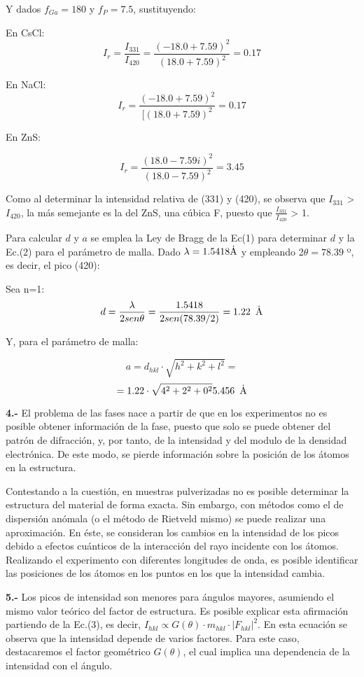 \documentclass[a4paper,twocolumn,10pt]{article}
\begin{document}
Y dados $f_{Ga} = 180$ y $f_{P} =7.5$, sustituyendo:

En CsCl:
$$
I_r = \frac{I_{331}}{I_{420}} = \frac{(-18.0 + 7.59)^2}{(18.0 + 7.59)^2} = 0.17
$$

En NaCl:
$$
I_r =  \frac{ (-18.0 + 7.59)^2}{[(18.0 + 7.59)^2} = 0.17
$$

En ZnS:

$$
I_r = \frac{ (18.0 - 7.59i)^2}{(18.0 - 7.59)^2} = 3.45
$$

Como al determinar la intensidad relativa de (331) y (420), se observa que $I_{331}$ > $I_{420}$, la más semejante es la del ZnS, una cúbica F, puesto que $\frac{I_{331}}{I_{420}}$ > 1.

Para calcular $d$ y $a$ se emplea la Ley de Bragg de la Ec(1) para determinar $d$ y la Ec.(2) para el parámetro de malla. Dado $\lambda = 1.5418 \rm \dot{A}$ y empleando 2$\theta = 78.39$ º, es decir, el pico (420):

Sea n=1:
$$
d= \frac{\lambda}{2sen\theta} = \frac{1.5418}{2sen(78.39/2)} = 1.22 \rm \textcolor{white}{a} \dot{A}
$$

Y, para el parámetro de malla:

$$
a =  d_{hkl} \cdot \sqrt{h^2 + k^2 + l^2} = 
$$
$$
= 1.22 \cdot \sqrt{4^2 + 2^2 + 0^2} 5.456 \rm \textcolor{white}{a} \dot{A}
$$

\textbf{4.- } El problema de las fases nace a partir de que en los experimentos no es posible obtener información de la fase, puesto que solo se puede obtener del patrón de difracción, y, por tanto, de la intensidad y del modulo de la densidad electrónica. De este modo, se pierde información sobre la posición de los átomos en la estructura.

Contestando a la cuestión, en muestras pulverizadas no es posible determinar la estructura del material de forma exacta. Sin embargo, con métodos como el de dispersión anómala (o el método de Rietveld mismo) se puede realizar una aproximación. En éste, se consideran los cambios en la intensidad de los picos debido a efectos cuánticos de la interacción del rayo incidente con los átomos. Realizando el experimento con diferentes longitudes de onda, es posible identificar las posiciones de los átomos en los puntos en los que la intensidad cambia. 

\textbf{5.- } Los picos de intensidad son menores para ángulos mayores, asumiendo el mismo valor teórico del factor de estructura. Es posible explicar esta afirmación partiendo de la Ec.(3), es decir, $I_{hkl} \propto G(\theta) \cdot m_{hkl} \cdot |F_{hkl}|^2$. En esta ecuación se observa que la intensidad depende de varios factores. Para este caso, destacaremos el factor geométrico $G(\theta)$, el cual implica una dependencia de la intensidad con el ángulo.
\end{document}
